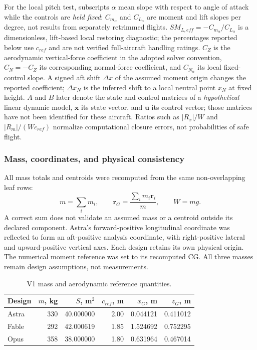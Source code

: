 \documentclass[10pt,letterpaper]{article}
\begin{document}
For the local pitch test, subscripts $\alpha$ mean slope with respect to angle of attack while the controls are \emph{held fixed}: $C_{m_\alpha}$ and $C_{L_\alpha}$ are moment and lift slopes per degree, not results from separately retrimmed flights. $SM_{L,eff}=-C_{m_\alpha}/C_{L_\alpha}$ is a dimensionless, lift-based local restoring diagnostic; the percentages reported below use $c_{ref}$ and are not verified full-aircraft handling ratings. $C_Z$ is the aerodynamic vertical-force coefficient in the adopted solver convention, $C_N=-C_Z$ its corresponding normal-force coefficient, and $C_{N_\alpha}$ its local fixed-control slope. A signed aft shift $\Delta x$ of the assumed moment origin changes the reported coefficient; $\Delta x_N$ is the inferred shift to a local neutral point $x_N$ at fixed height. $A$ and $B$ later denote the state and control matrices of a \emph{hypothetical} linear dynamic model, $\boldsymbol x$ its state vector, and $\boldsymbol u$ its control vector; those matrices have not been identified for these aircraft. Ratios such as $|R_x|/W$ and $|R_m|/(Wc_{ref})$ normalize computational closure errors, not probabilities of safe flight.

\subsubsection{Mass, coordinates, and physical consistency}
All mass totals and centroids were recomputed from the same non-overlapping leaf rows:
\begin{equation}
m=\sum_i m_i,\qquad \boldsymbol r_G=\frac{\sum_i m_i\boldsymbol r_i}{m},\qquad W=mg.
\label{eq:mass}
\end{equation}
A correct sum does not validate an assumed mass or a centroid outside its declared component. Astra's forward-positive longitudinal coordinate was reflected to form an aft-positive analysis coordinate, with right-positive lateral and upward-positive vertical axes. Each design retains its own physical origin. The numerical moment reference was set to its recomputed CG. All three masses remain design assumptions, not measurements.

\begin{table}[H]\centering\small
\caption{V1 mass and aerodynamic reference quantities.}\label{tab:refs}
\begin{tabular}{lrrrrr}\toprule
Design & $m$, kg & $S$, m$^2$ & $c_{ref}$, m & $x_G$, m & $z_G$, m\\\midrule
Astra &330&40.000000&2.00&0.044121&0.411012\\
Fable &292&42.000619&1.85&1.524692&0.752295\\
Opus &358&38.000000&1.80&0.631964&0.467014\\\bottomrule
\end{tabular}
\end{table}
\end{document}
